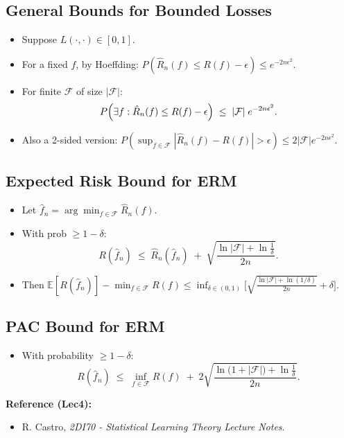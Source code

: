 \documentclass[10pt]{article}
\begin{document}
\begin{multicols}{2}
\subsection*{General Bounds for Bounded Losses}
\begin{itemize}
\item Suppose $L(\cdot,\cdot)\in[0,1]$.
\item For a fixed $f$, by Hoeffding:
$P(\hat{R}_n(f)\le R(f)-\epsilon)\le e^{-2n\epsilon^2}$.
\item For finite $\mathcal{F}$ of size $|\mathcal{F}|$:
\[
P\Bigl(\exists f: \hat{R}_n(f)\le R(f)-\epsilon\Bigr)\;\le\;|\mathcal{F}|\;e^{-2n\epsilon^2}.
\]
\item Also a 2-sided version: 
$P(\sup_{f\in\mathcal{F}}|\hat{R}_n(f)-R(f)|>\epsilon)\le 2|\mathcal{F}|e^{-2n\epsilon^2}$.
\end{itemize}

\subsection*{Expected Risk Bound for ERM}
\begin{itemize}
\item Let $\hat{f}_n=\arg\min_{f\in\mathcal{F}} \hat{R}_n(f)$.
\item With prob $\ge1-\delta$:
\[
R(\hat{f}_n)\;\le\;\hat{R}_n(\hat{f}_n)\;+\;\sqrt{\frac{\ln|\mathcal{F}|+\ln\frac{1}{\delta}}{2n}}.
\]
\item Then 
$\mathbb{E}[R(\hat{f}_n)]-\min_{f\in\mathcal{F}} R(f)\le \inf_{\delta\in(0,1)}\bigl[\sqrt{\tfrac{\ln|\mathcal{F}|+\ln(1/\delta)}{2n}}+\delta\bigr].$
\end{itemize}

\subsection*{PAC Bound for ERM}
\begin{itemize}
\item With probability $\ge1-\delta$:
\[
R(\hat{f}_n)\;\le\;\inf_{f\in\mathcal{F}} R(f)\;+\;2\sqrt{\frac{\ln\bigl(1+|\mathcal{F}|\bigr)+\ln\frac{1}{\delta}}{2n}}.
\]
\end{itemize}

\vfill
\textbf{Reference (Lec4):}
\begin{itemize}\setlength{\itemsep}{0pt}
\item R. Castro, \emph{2DI70 - Statistical Learning Theory Lecture Notes}.
\end{itemize}



\end{multicols}
\end{document}
